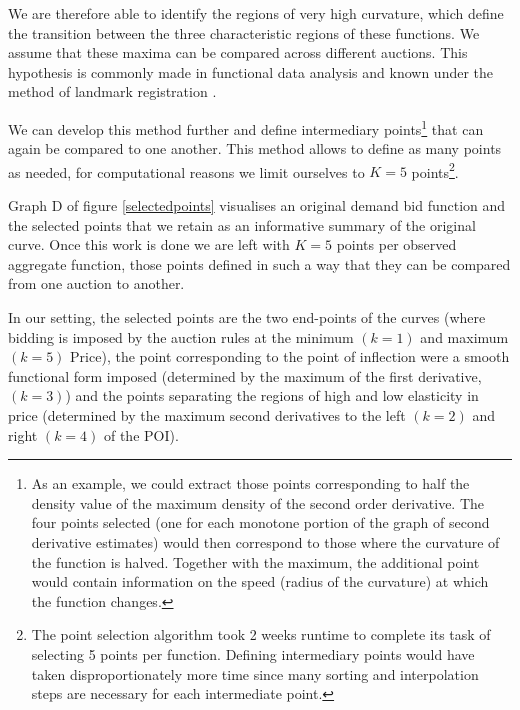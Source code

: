 We are therefore able to identify the regions of very high curvature, which define the transition between the three characteristic regions of these functions. We assume that these maxima can be compared across different auctions. This hypothesis is commonly made in functional data analysis and known under the method of landmark registration \cite{ramsaysilverman2005functional}.

We can develop this method further and define intermediary points\footnote{As an example, we could extract those points corresponding to half the density value of the maximum density of the second order derivative. The four points selected (one for each monotone portion of the graph of second derivative estimates) would then correspond to those where the curvature of the function is halved. Together with the maximum, the additional point would contain information on the speed (radius of the curvature) at which the function changes.} that can again be compared to one another. This method allows to define as many points as needed, for computational reasons we limit ourselves to $K=5$ points\footnote{The point selection algorithm took 2 weeks runtime to complete its task of selecting 5 points per function. Defining intermediary points would have taken disproportionately more time since many sorting and interpolation steps are necessary for each intermediate point.}. %

Graph D of figure \ref{selectedpoints} visualises an original demand bid function and the selected points that we retain as an informative summary of the original curve.
Once this work is done we are left with $K=5$ points per observed aggregate function, those points defined in such a way that they can be compared from one auction to another. 

In our setting, the selected points are the two end-points of the curves (where bidding is imposed by the auction rules at the minimum $(k=1)$ and maximum $(k=5)$ Price), the point corresponding to the point of inflection were a smooth functional form imposed (determined by the maximum of the first derivative, $(k=3)$) and the points separating the regions of high and low elasticity in price (determined by the maximum second derivatives to the left $(k=2)$ and right $(k=4)$ of the POI). %


